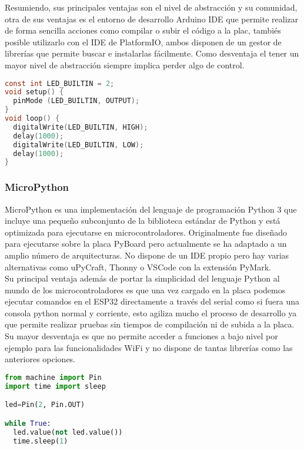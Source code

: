 \documentclass[../proyecto.tex]{subfiles}
\begin{document}
Resumiendo, sus principales ventajas son el nivel de abstracción y su comunidad, otra de sus ventajas es el entorno de desarrollo Arduino IDE que permite realizar de forma sencilla acciones como compilar o subir el código a la plac, tambiés posible utilizarlo con el IDE de PlatformIO, ambos disponen de un gestor de librerías que permite buscar e instalarlas fácilmente. Como desventaja el tener un mayor nivel de abstracción siempre implica perder algo de control.\\

\begin{minipage}{\linewidth}
\begin{lstlisting}[language=C, caption=Ejemplo de código para hacer parpadear un led con Arduino, captionpos=b, frame=single]
const int LED_BUILTIN = 2;
void setup() {
  pinMode (LED_BUILTIN, OUTPUT);
}
void loop() {
  digitalWrite(LED_BUILTIN, HIGH);
  delay(1000);
  digitalWrite(LED_BUILTIN, LOW);
  delay(1000);
}
\end{lstlisting}
\end{minipage}

\subsubsection{MicroPython}
MicroPython es una implementación del lenguaje de programación Python 3 que incluye una pequeño subconjunto de la biblioteca estándar de Python y está optimizada para ejecutarse en microcontroladores. Originalmente fue diseñado para ejecutarse sobre la placa PyBoard pero actualmente se ha adaptado a un amplio número de arquitecturas. No dispone de un IDE propio pero hay varias alternativas como uPyCraft, Thonny o  VSCode con la extensión PyMark.\\

Su principal ventaja además de portar la simplicidad del lenguaje Python al mundo de los microcontroladores es que una vez cargado en la placa podemos ejecutar comandos en el ESP32 directamente a través del serial como si fuera una consola python normal y corriente, esto agiliza mucho el proceso de desarrollo ya que permite realizar pruebas sin tiempos de compilación ni de subida a la placa. Su mayor desventaja es que no permite acceder  a funciones a bajo nivel por ejemplo para las funcionalidades WiFi y no dispone de tantas librerías como las anteriores opciones.\\

\begin{minipage}{\linewidth}
\begin{lstlisting}[language=Python, caption=Ejemplo de código para hacer parpadear un led con MicroPython, captionpos=b, frame=single]
from machine import Pin
import time import sleep

led=Pin(2, Pin.OUT)

while True:
  led.value(not led.value())
  time.sleep(1)
\end{lstlisting}
\end{minipage}
\end{document}
